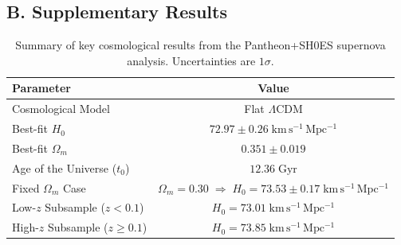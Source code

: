\documentclass[12pt]{article}
\begin{document}
\subsection*{B. Supplementary Results}
\begin{table}[H]
    \centering
    \renewcommand{\arraystretch}{1.2} %
    \begin{tabular}{|l|c|}
        \hline
        \textbf{Parameter} & \textbf{Value} \\
        \hline
        Cosmological Model & Flat $\Lambda$CDM \\
        Best-fit $H_0$ & $72.97 \pm 0.26 \;\mathrm{km\,s^{-1}\,Mpc^{-1}}$ \\
        Best-fit $\Omega_m$ & $0.351 \pm 0.019$ \\
        Age of the Universe ($t_0$) & $12.36 \;\mathrm{Gyr}$ \\
        Fixed $\Omega_m$ Case & $\Omega_m = 0.30 \;\Rightarrow\; H_0 = 73.53 \pm 0.17 \;\mathrm{km\,s^{-1}\,Mpc^{-1}}$ \\
        Low-$z$ Subsample ($z<0.1$) & $H_0 = 73.01 \;\mathrm{km\,s^{-1}\,Mpc^{-1}}$ \\
        High-$z$ Subsample ($z\ge 0.1$) & $H_0 = 73.85 \;\mathrm{km\,s^{-1}\,Mpc^{-1}}$ \\
        \hline
    \end{tabular}
    \caption{Summary of key cosmological results from the Pantheon+SH0ES supernova analysis. Uncertainties are $1\sigma$.}
\end{table}
\end{document}
